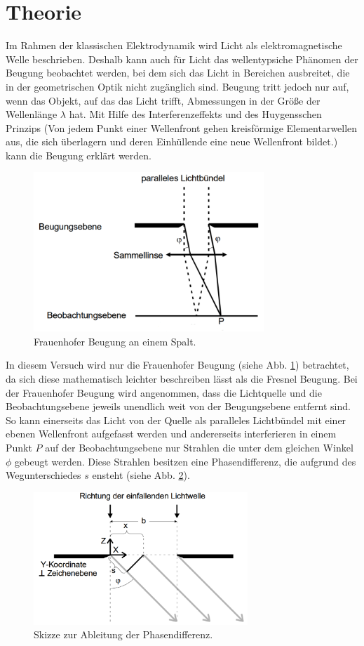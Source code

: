 \section{Theorie}
\label{sec:Theorie}

Im Rahmen der klassischen Elektrodynamik wird Licht als elektromagnetische Welle beschrieben.
Deshalb kann auch für Licht das wellentypsiche Phänomen der Beugung beobachtet werden,
bei dem sich das Licht in Bereichen ausbreitet, die in der geometrischen Optik nicht zugänglich sind.
Beugung tritt jedoch nur auf, wenn das Objekt, auf das das Licht trifft, Abmessungen in der Größe der Wellenlänge $\lambda$ hat.
Mit Hilfe des Interferenzeffekts und des Huygensschen Prinzips
(Von jedem Punkt einer Wellenfront gehen kreisförmige Elementarwellen aus, die sich überlagern und deren Einhüllende eine neue Wellenfront bildet.)
kann die Beugung erklärt werden.
\begin{figure}
  \centering
  \includegraphics[height=6cm]{data/frau.png}
  \caption{Frauenhofer Beugung an einem Spalt. \cite{sample}}
  \label{fig:frau}
\end{figure}
In diesem Versuch wird nur die Frauenhofer Beugung (siehe Abb. \ref{fig:frau}) betrachtet, da sich diese mathematisch leichter beschreiben lässt als die Fresnel Beugung.
Bei der Frauenhofer Beugung wird angenommen, dass die Lichtquelle und die Beobachtungsebene jeweils unendlich weit von der Beugungsebene entfernt sind.
So kann einerseits das Licht von der Quelle als paralleles Lichtbündel mit einer ebenen Wellenfront aufgefasst werden und
andererseits interferieren in einem Punkt $P$ auf der Beobachtungsebene nur Strahlen die unter dem gleichen Winkel $\phi$ gebeugt werden.
Diese Strahlen besitzen eine Phasendifferenz, die aufgrund des Wegunterschiedes $s$ ensteht (siehe Abb. \ref{fig:phase}).
\begin{figure}
  \centering
  \includegraphics[height=5cm]{data/phase.png}
  \caption{Skizze zur Ableitung der Phasendifferenz. \cite{sample}}
  \label{fig:phase}
\end{figure}

